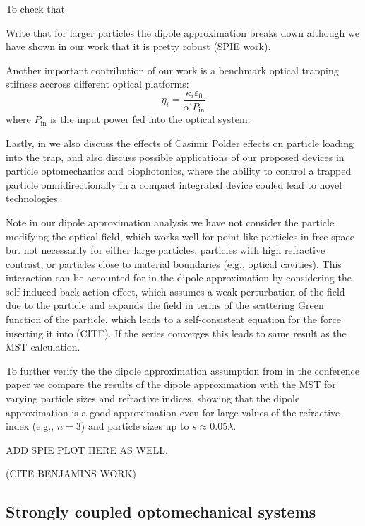 To check that 


Write that for larger particles the dipole approximation breaks down
although we have shown in our work that it is pretty robust (SPIE work).

Another important contribution of our work is a benchmark optical trapping stifness accross different
optical platforms:
\begin{equation}
    \eta_i=\frac{\kappa_i \varepsilon_0}{\alpha^\prime P_{\text{in}}}
\end{equation}
where $P_{\text{in}}$ is the input power fed into the optical system. 


Lastly, in \cite{ownpub2} we also discuss the effects of Casimir Polder effects on particle loading into the trap, and
also discuss possible applications of our proposed devices in particle optomechanics and
biophotonics, where the ability to control a trapped particle omnidirectionally in a compact integrated device
couled lead to novel technologies.


Note in our dipole approximation analysis we have not consider the particle modifying
the optical field, which works well for point-like particles in free-space but not necessarily 
for either large particles, particles with high refractive contrast, or particles close to material
boundaries (e.g., optical cavities). This interaction can be accounted for in the dipole
approximation by considering the self-induced back-action effect, which assumes a weak
perturbation of the field due to the particle and expands the field in terms of 
the scattering Green function of the particle, which leads to a self-consistent
equation for the force inserting it into (CITE). If the series converges this leads 
to same result as the MST calculation. 

To further verify the the dipole approximation assumption from \cite{ownpub2} in the 
conference paper \cite{ownpub3} we compare the results of the dipole approximation with the MST
for varying particle sizes and refractive indices, showing that the dipole approximation is a good approximation
even for large values of the refractive index (e.g., $n=3$) and particle sizes up to $s\approx 0.05 \lambda$. 

ADD SPIE PLOT HERE AS WELL.

(CITE BENJAMINS WORK)

\subsection*{Strongly coupled optomechanical systems}

